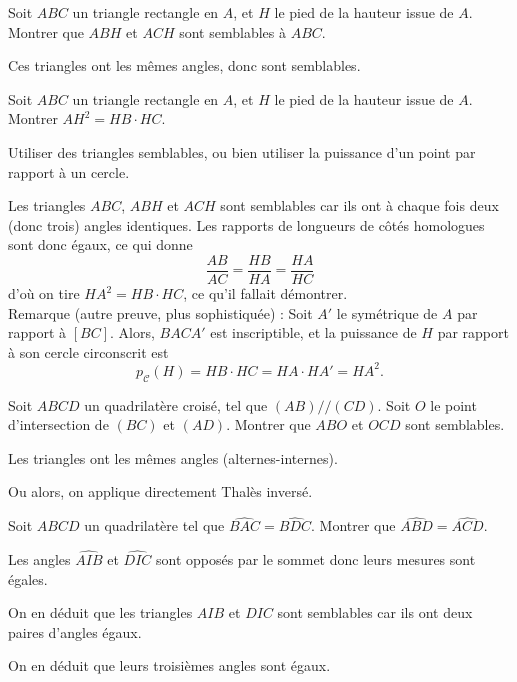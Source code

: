 \begin{exo}
Soit $ABC$ un triangle rectangle en $A$, et $H$ le pied de la hauteur issue de $A$. Montrer que $ABH$ et $ACH$ sont semblables à $ABC$.
\begin{sol}
Ces triangles ont les mêmes angles, donc sont semblables.
\end{sol}
\end{exo}

\begin{exo}[$HA^2=HB\cdot HC$] %
Soit $ABC$ un triangle rectangle en $A$, et $H$ le pied de la hauteur issue de $A$. Montrer $AH^2 = HB\cdot HC$.

\begin{hint}
Utiliser des triangles semblables, ou bien utiliser la puissance d'un point par rapport à un cercle.
\end{hint}
\begin{sol} 
Les triangles $ABC$, $ABH$ et $ACH$ sont semblables car ils ont à chaque fois deux (donc trois) angles identiques. Les rapports de longueurs de côtés homologues sont donc égaux, ce qui donne
\[ \frac{AB}{AC} = \frac{HB}{HA} = \frac{HA}{HC}\]
d'où on tire $HA^2 = HB\cdot HC$, ce qu'il fallait démontrer.\\

Remarque (autre preuve, plus sophistiquée) : Soit $A'$ le symétrique de $A$ par rapport à $[BC]$. Alors, $BACA'$ est inscriptible, et la puissance de $H$ par rapport à son cercle circonscrit est 
\[ p_{\mathcal C}(H) = HB\cdot HC=  HA\cdot HA' = HA^2.\]
\end{sol}
\end{exo}


\begin{exo}
Soit $ABCD$ un quadrilatère croisé, tel que $(AB)//(CD)$. Soit $O$ le point d'intersection de $(BC)$ et $(AD)$. Montrer que $ABO$ et $OCD$ sont semblables.
\begin{sol}
Les triangles ont les mêmes angles (alternes-internes).

Ou alors, on applique directement Thalès \og inversé\fg.
\end{sol}
\end{exo}

\begin{exo}[Un quadrilatère]
Soit $ABCD$ un quadrilatère tel que $\widehat{BAC} = \widehat{BDC}$. Montrer que $\widehat{ABD}=\widehat{ACD}$.
\begin{sol}
Les angles $\widehat{AIB}$ et $\widehat{DIC}$ sont opposés par le sommet donc leurs mesures sont égales.

On en déduit que les triangles $AIB$ et $DIC$ sont semblables car ils ont deux paires d'angles égaux. 

On en déduit que leurs troisièmes angles sont égaux.
\end{sol}
\end{exo}

